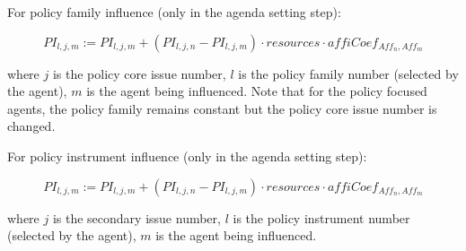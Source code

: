 \documentclass[11pt]{article}
\begin{document}
For policy family influence (only in the agenda setting step):

\begin{equation}\label{eq:impactPFChangePolicy}
PI_{l,j,m} := PI_{l,j,m} + \left(PI_{l,j,n} - PI_{l,j,m} \right) \cdot resources \cdot affiCoef_{Aff_n,Aff_m}
\end{equation}

where $j$ is the policy core issue number, $l$ is the policy family number (selected by the agent), $m$ is the agent being influenced. Note that for the policy focused agents, the policy family remains constant but the policy core issue number is changed.

For policy instrument influence (only in the agenda setting step):

\begin{equation}\label{eq:impactPFChangeProblem}
PI_{l,j,m} := PI_{l,j,m} + \left(PI_{l,j,n} - PI_{l,j,m} \right) \cdot resources \cdot affiCoef_{Aff_n,Aff_m}
\end{equation}

where $j$ is the secondary issue number, $l$ is the policy instrument number (selected by the agent), $m$ is the agent being influenced.


\appendix


 

\end{document}
